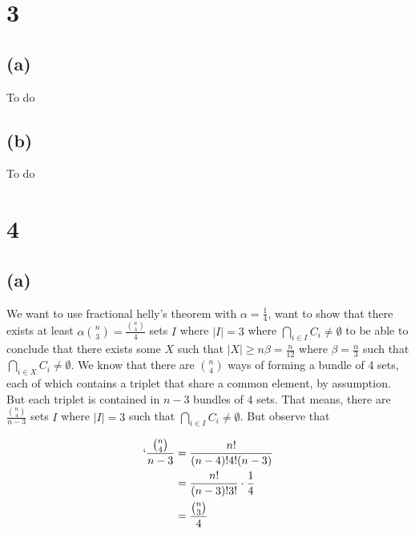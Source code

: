 \documentclass[a4paper,11pt]{article}
\begin{document}
\section*{3}

\subsection*{(a)}
To do 
\subsection*{(b)}
To do

\clearpage
\section*{4}

\subsection*{(a)}
We want to use fractional helly's theorem with $\alpha = \frac{1}{4}$, want to show that there exists at least $\alpha \binom{n}{3} = \frac{\binom{n}{3}}{4}$ sets $I$ where $|I| = 3$ where $\bigcap_{i \in I} C_i \neq \emptyset$ to be able to conclude that there exists some $X$ such that $|X| \geq n \beta = \frac{n}{12}$ where $\beta = \frac{\alpha}{3}$ such that $\bigcap_{i \in X} C_i \neq \emptyset$. We know that there are $\binom{n}{4}$ ways of forming a bundle of 4 sets, each of which contains a triplet that share a common element, by assumption. But each triplet is contained in $n-3$ bundles of 4 sets. That means, there are $\displaystyle \frac{\binom{n}{4}}{n-3}$ sets $I$ where $|I| = 3$ such that $\bigcap_{i \in I} C_i \neq \emptyset$. But observe that 

\begin{align*}`	
	\frac{\binom{n}{4}}{n-3} &= \frac{n!}{(n-4)!4!(n-3)}\\
				 &= \frac{n!}{(n-3)!3!} \cdot \frac{1}{4}\\
				 &= \frac{\binom{n}{3}}{4}
\end{align*}
\end{document}

